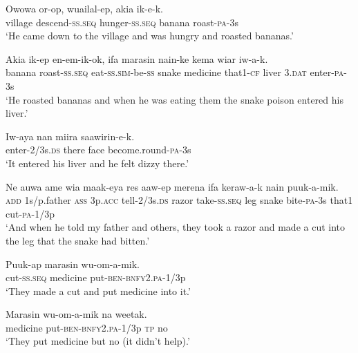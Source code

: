 \ea\label{ex:a:x9}
\gll  Owowa  or-op,  wuailal-ep,  akia  ik-e-k. \\
village  descend-\textsc{ss.seq}  hunger-\textsc{ss.seq}  banana  roast-\textsc{pa}-3s \\
\glt ‘He came down to the village and was hungry and roasted bananas.’ \\
\z


\ea\label{ex:a:x10}
\gll  Akia  ik-ep  en-em-ik-ok,  ifa  marasin  nain-ke              kema  wiar  iw-a-k. \\
banana  roast-\textsc{ss.seq}  eat-\textsc{ss}.\textsc{sim}-be-\textsc{ss}  snake  medicine  that1-\textsc{cf}   liver  3.\textsc{dat}  enter-\textsc{pa}-3s \\


\glt ‘He roasted bananas and when he was eating them the snake poison entered his liver.’ \\
\z


\ea\label{ex:a:x11}
\gll  Iw-aya  nan  miira  saawirin-e-k. \\
enter-2/3s.\textsc{ds}  there  face  become.round-\textsc{pa}-3s \\
\glt ‘It entered his liver and he felt dizzy there.’ \\
\z


\ea\label{ex:a:x12}
\gll  Ne  auwa  ame  wia  maak-eya  res  aaw-ep                  merena  ifa  keraw-a-k  nain  puuk-a-mik. \\
\textsc{add}  1s/p.father  \textsc{ass}  3p.\textsc{acc}  tell-2/3s.\textsc{ds}  razor  take-\textsc{ss.seq}  leg  snake  bite-\textsc{pa}-3s  that1  cut-\textsc{pa}-1/3p \\


\glt ‘And when he told my father and others, they took a razor and made a cut into the leg that the snake had bitten.’ \\
\z


\ea\label{ex:a:x13}
\gll  Puuk-ap  marasin  wu-om-a-mik. \\
cut-\textsc{ss.seq}  medicine  put-\textsc{ben}-\textsc{bnfy}2.\textsc{pa}-1/3p \\
\glt ‘They made a cut and put medicine into it.’ \\
\z


\ea\label{ex:a:x14}
\gll  Marasin  wu-om-a-mik  na  weetak. \\
medicine  put-\textsc{ben}-\textsc{bnfy}2.\textsc{pa}-1/3p  \textsc{tp}  no \\
\glt ‘They put medicine but no (it didn’t help).’ \\
\z


